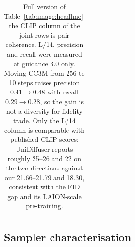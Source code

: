 \begin{table}[tb]
\begin{tabular}{llrrrrrrrrr}
\bottomrule
\end{tabular}
\caption{Full version of Table~\ref{tab:image:headline}; the CLIP column of the joint rows is pair
coherence. L/14, precision and recall were measured at guidance 3.0 only. Moving CC3M from 256 to
10 steps raises precision $0.41\rightarrow0.48$ with recall $0.29\rightarrow0.28$, so the gain is
not a diversity-for-fidelity trade. Only the L/14 column is comparable with published CLIP scores:
UniDiffuser \citep{image:unidiffuser} reports roughly 25--26 and 22 on the two directions against
our 21.66--21.79 and 18.30, consistent with the FID gap and its LAION-scale pre-training.}
\label{tab:app:image:headline-full}
\end{table}

\subsection{Sampler characterisation}
\label{app:image:sampler}

